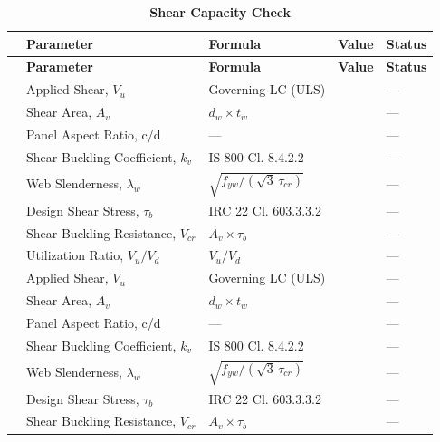 \documentclass[12pt,a4paper]{report}
\numberwithin{table}{chapter}
\numberwithin{figure}{chapter}
\newcommand{\reportrowpad}{4pt}
\newcommand{\reportsectiongap}{0.75em}
\begin{document}
\vspace{\reportsectiongap}
\begin{longtable}{|C{2.5cm}|C{3.5cm}|C{3.5cm}|>{\centering\arraybackslash}p{4.2cm}|C{1.8cm}|}
\caption{\textbf{Shear Capacity Check}}\\
\hline
\textbf{} & \textbf{Parameter} & \textbf{Formula} & \textbf{Value} & \textbf{Status} \\[\reportrowpad]
\hline
\endfirsthead
\hline
\textbf{} & \textbf{Parameter} & \textbf{Formula} & \textbf{Value} & \textbf{Status} \\[\reportrowpad]
\hline
\endhead
{} & Applied Shear, $V_u$ & Governing LC (ULS) &  & --- \\[\reportrowpad]
 & Shear Area, $A_v$ & $d_w \times t_w$ &  & --- \\[\reportrowpad]
 & Panel Aspect Ratio, c/d & --- &  & --- \\[\reportrowpad]
 & Shear Buckling Coefficient, $k_v$ & IS 800 Cl. 8.4.2.2 &  & --- \\[\reportrowpad]
 & Web Slenderness, $\lambda_w$ & $\sqrt{f_{yw}/(\sqrt{3}\,\tau_{cr})}$ &  & --- \\[\reportrowpad]
 & Design Shear Stress, $\tau_b$ & IRC 22 Cl. 603.3.3.2 &  & --- \\[\reportrowpad]
 & Shear Buckling Resistance, $V_{cr}$ & $A_v \times \tau_b$ &  & --- \\[\reportrowpad]
 & Utilization Ratio, $V_u / V_d$ & $V_u / V_d$ &  & --- \\[\reportrowpad]
\hline
{} & Applied Shear, $V_u$ & Governing LC (ULS) &  & --- \\[\reportrowpad]
 & Shear Area, $A_v$ & $d_w \times t_w$ &  & --- \\[\reportrowpad]
 & Panel Aspect Ratio, c/d & --- &  & --- \\[\reportrowpad]
 & Shear Buckling Coefficient, $k_v$ & IS 800 Cl. 8.4.2.2 &  & --- \\[\reportrowpad]
 & Web Slenderness, $\lambda_w$ & $\sqrt{f_{yw}/(\sqrt{3}\,\tau_{cr})}$ &  & --- \\[\reportrowpad]
 & Design Shear Stress, $\tau_b$ & IRC 22 Cl. 603.3.3.2 &  & --- \\[\reportrowpad]
 & Shear Buckling Resistance, $V_{cr}$ & $A_v \times \tau_b$ &  & --- \\[\reportrowpad]

\end{longtable}
\end{document}

